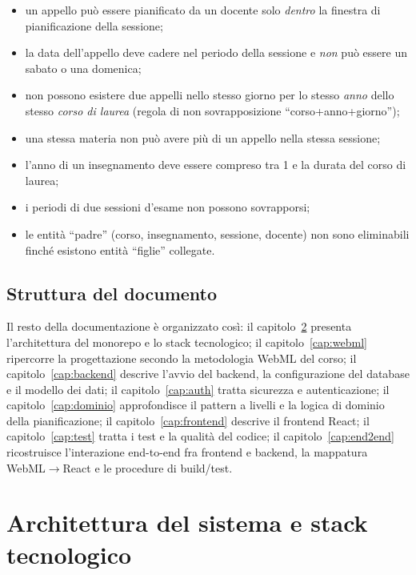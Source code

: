 \documentclass[11pt,a4paper,oneside]{report}
\begin{document}
\begin{itemize}[leftmargin=1.4em]
  \item un appello può essere pianificato da un docente solo \emph{dentro} la
        finestra di pianificazione della sessione;
  \item la data dell'appello deve cadere nel periodo della sessione e \emph{non}
        può essere un sabato o una domenica;
  \item non possono esistere due appelli nello stesso giorno per lo stesso
        \emph{anno} dello stesso \emph{corso di laurea} (regola di non
        sovrapposizione ``corso+anno+giorno'');
  \item una stessa materia non può avere più di un appello nella stessa
        sessione;
  \item l'anno di un insegnamento deve essere compreso tra 1 e la durata del
        corso di laurea;
  \item i periodi di due sessioni d'esame non possono sovrapporsi;
  \item le entità ``padre'' (corso, insegnamento, sessione, docente) non sono
        eliminabili finché esistono entità ``figlie'' collegate.
\end{itemize}

\section{Struttura del documento}
Il resto della documentazione è organizzato così:
il capitolo~\ref{cap:arch} presenta l'architettura del monorepo e lo stack
tecnologico; il capitolo~\ref{cap:webml} ripercorre la progettazione secondo la
metodologia WebML del corso; il capitolo~\ref{cap:backend} descrive l'avvio del backend, la
configurazione del database e il modello dei dati; il capitolo~\ref{cap:auth}
tratta sicurezza e autenticazione; il capitolo~\ref{cap:dominio} approfondisce
il pattern a livelli e la logica di dominio della pianificazione; il
capitolo~\ref{cap:frontend} descrive il frontend React; il
capitolo~\ref{cap:test} tratta i test e la qualità del codice; il
capitolo~\ref{cap:end2end} ricostruisce l'interazione end-to-end fra frontend e
backend, la mappatura WebML$\rightarrow$React e le procedure di build/test.

\chapter{Architettura del sistema e stack tecnologico}
\label{cap:arch}
\end{document}
